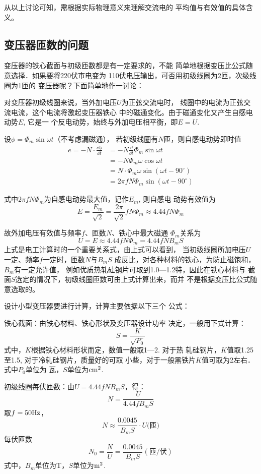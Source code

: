 从以上讨论可知，需根据实际物理意义来理解交流电的
平均值与有效值的具体含义。

\subsection{变压器匝数的问题}
变压器的铁心截面与初级匝数都是有一定要求的，不能
简单地根据变压比公式随意选择．如果要将220伏市电变为
110伏电压输出，可否用初级线圈为2匝，次级线圈为1匝的
变压器呢？下面简单地作一讨论：

对变压器初级线圈来说，当外加电压$U$为正弦交流电时，
线圈中的电流为正弦交流电流，这个电流将激起变压器铁心
中的磁通变化。由于磁通变化又产生自感电动势$E$, 它是一
个反电动势，始终与外加电压相平衡，即$E=U$.

设$\phi=\Phi_m\sin\omega t$（不考虑漏磁通），
若初级线圈有$N$匝，则自感电动势即时值
\[\begin{split}
    e=-N\cdot \frac{\dd\phi}{\dd t}&=-N\frac{\dd}{\dd t}\Phi_m\sin\omega t\\
&=-N\Phi_m\omega \cos\omega t\\
&=N\cdot \Phi_m\omega \sin(\omega t-90^{\circ})\\
&=2\pi f N \Phi_m \sin(\omega t-90^{\circ})
\end{split}\]

式中$2\pi f N \Phi_m$为自感电动势最大值，记作$E_m$, 则自感电
动势有效值为
\[E=\frac{E_m}{\sqrt{2}}=\frac{2\pi}{\sqrt{2}}f N \Phi_m\approx 4.44 f N \Phi_m\]

故外加电压有效值与频率$f$、匝数$N$、铁心中最大磁通
$\Phi_m$关系为
\[U=E\approx 4.44fN\Phi_m=4.44fNB_mS\]
上式是电工计算时的一个重要关系式，由上式可以看到，
当初级线圈所加电压$U$一定、频率$f$一定时，匝数$N$与$B_mS$
成反比，对各种材料的铁心，为防止磁饱和，$B_m$有一定允许值，
例如优质热轧硅钢片可取到1.0—1.2特，因此在铁心材料与
截面$S$选定的情况下，初级线圈匝数可由上式计算出来，而并
不是根据变压比公式随意选取的。

设计小型变压器要进行计算，计算主要依据以下三个
公式：

铁心截面：由铁心材料、铁心形状及变压器设计功率
决定，一般用下式计算：
\[S=\frac{K}{\sqrt{P_0}}\]
式中，$K$根据铁心材料形状而定，数值一般取1—2. 对于热
轧硅钢片，$K$值取1.25至1.5, 对于冷轧硅钢片，质量好的可取
小些，对于一般黑铁片$K$值可取为2左右．式中$P_0$单位为
瓦，$S$单位为${\rm cm^2}$.

初级线圈每伏匝数：由$U=4.44fNB_mS$，得：
\[N=\frac{U}{4.44fB_mS}\]
取$f=50{\rm Hz}$，
\[N\approx \frac{0.0045}{B_mS}\cdot U \text{(匝)}\]
每伏匝数
\[N_0=\frac{N}{U}=\frac{0.0045}{B_mS}(\text{匝/伏})\]
式中，$B_m$单位为T，$S$单位为${\rm m^2}$.

